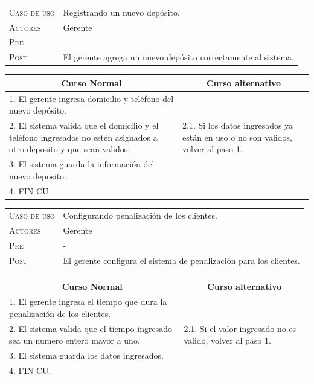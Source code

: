 \begin{tabular}{p{} p{}}
    \textsc{Caso de uso} & Registrando un nuevo depósito. \\
    \textsc{Actores} & Gerente \\
    \textsc{Pre} & - \\
    \textsc{Post} & El gerente agrega un nuevo depósito correctamente al sistema. \\
\end{tabular}

\begin{center}
\begin{tabular}{|p{}|p{}|}
    \hline
    \multicolumn{1}{|c|}{Curso Normal} &
    \multicolumn{1}{|c|}{Curso alternativo} \\
    \hline
    1. El gerente ingresa domicilio y teléfono del nuevo depósito. & \\
    2. El sistema valida que el domicilio y el teléfono ingresados no estén asignados a otro deposito y que sean validos. &
    2.1. Si los datos ingresados ya están en uso o no son validos, volver al paso 1. \\
    3. El sistema guarda la información del nuevo deposito. & \\
    4. FIN CU. & \\
    \hline
\end{tabular}
\end{center}


\vspace{2cm}

\begin{tabular}{p{} p{}}
    \textsc{Caso de uso} & Configurando penalización de los clientes. \\
    \textsc{Actores} & Gerente \\
    \textsc{Pre} & - \\
    \textsc{Post} & El gerente configura el sistema de penalización para los
    clientes. \\
\end{tabular}

\begin{center}
\begin{tabular}{|p{}|p{}|}
    \hline
    \multicolumn{1}{|c|}{Curso Normal} &
    \multicolumn{1}{|c|}{Curso alternativo} \\
    \hline
    1. El gerente ingresa el tiempo que dura la penalización de los clientes. &
    \\
    2. El sistema valida que el tiempo ingresado sea un numero entero mayor a uno. &
    2.1. Si el valor ingresado no es valido, volver al paso 1. \\
    3. El sistema guarda los datos ingresados. & \\
    4. FIN CU. & \\
    \hline
\end{tabular}
\end{center}

